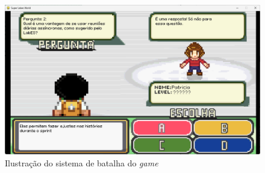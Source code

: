 \begin{figure}[h!]
    \centering
    \includegraphics[width=1\linewidth]{figuras/battle.png}
    \caption{Ilustração do sistema de batalha do \textit{game}}
    \label{fig:battle}
\end{figure}
